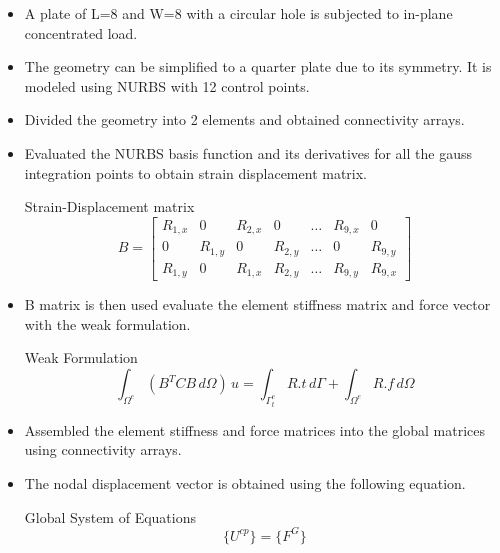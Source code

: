 \documentclass{beamer}
\begin{document}
\begin{frame}[allowframebreaks]
\begin{minipage}[b]{0.48\linewidth}
    \centering \label{Deformed Plate}
  \end{minipage}
\begin{itemize}
    \item A plate of L=8 and W=8 with a circular hole is subjected to in-plane concentrated load.

    \item The geometry can be simplified to a quarter plate due to its symmetry. It is modeled using NURBS with 12 control points.
\newpage
  
    \item Divided the geometry into 2 elements and obtained connectivity arrays.
    \item Evaluated the NURBS basis function and its derivatives for all the gauss integration points to obtain strain displacement matrix.
    \begin{block}{Strain-Displacement matrix}
    \begin{equation*}
        B=\begin{bmatrix}
        R_{1,x} & 0 & R_{2,x} & 0 & \dots & R_{9,x} & 0\\
        0 & R_{1,y} & 0 &R_{2,y} & \dots & 0 & R_{9,y}\\
        R_{1,y} & 0 &R_{1,x} &  R_{2,y} & \dots &  R_{9,y} &R_{9,x}
        \end{bmatrix}
    \end{equation*}
    \end{block}
    \item B matrix is then used evaluate the element stiffness matrix and force vector with the weak formulation.
    \begin{block}{Weak Formulation}
    \begin{equation*}
        \int_{\Omega^e} (B^TCB  \,d\Omega)\,u = \int_{\Gamma^e_t} R.t \,d\Gamma +\int_{\Omega^e} R.f \,d\Omega
    \end{equation*}
    \end{block}
    \item Assembled the element stiffness and force matrices into the global matrices using connectivity arrays.
    \item The nodal displacement vector is obtained using the following equation.
      \begin{block}{Global System of Equations}
      \begin{equation}
          [K^G]\{U^{cp}\}=\{F^{G}\}
      \end{equation}
      \end{block}
      \newpage
  

\end{itemize}
\end{frame}
\end{document}
